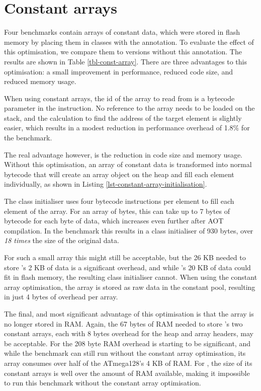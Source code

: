 \section{Constant arrays}
\label{sec-evaluation-const-array}


Four benchmarks contain arrays of constant data, which were stored in flash memory by placing them in classes with the  annotation. To evaluate the effect of this optimisation, we compare them to versions without this annotation. The results are shown in Table \ref{tbl-const-array}. There are three advantages to this optimisation: a small improvement in performance, reduced code size, and reduced memory usage.

When using constant arrays, the id of the array to read from is a bytecode parameter in the  instruction. No reference to the array needs to be loaded on the stack, and the calculation to find the address of the target element is slightly easier, which results in a modest reduction in performance overhead of 1.8\% for the  benchmark.

The real advantage however, is the reduction in code size and memory usage. Without this optimisation, an array of constant data is transformed into normal bytecode that will create an array object on the heap and fill each element individually, as shown in Listing \ref{lst-constant-array-initialisation}.

The class initialiser uses four bytecode instructions per element to fill each element of the array. For an array of bytes, this can take up to 7 bytes of bytecode for each byte of data, which increases even further after AOT compilation. In the  benchmark this results in a class initialiser of 930 bytes, over \emph{18 times} the size of the original data. 

For such a small array this might still be acceptable, but the 26 KB needed to store 's 2 KB of data is a significant overhead, and while 's 20 KB of data could fit in flash memory, the resulting class initialiser cannot. When using the constant array optimisation, the array is stored as raw data in the constant pool, resulting in just 4 bytes of overhead per array.

The final, and most significant advantage of this optimisation is that the array is no longer stored in RAM. Again, the 67 bytes of RAM needed to store 's two constant arrays, each with 8 bytes overhead for the heap and array headers, may be acceptable. For  the 208 byte RAM overhead is starting to be significant, and while the  benchmark can still run without the constant array optimisation, its array consumes over half of the ATmega128's 4 KB of RAM. For , the size of its constant arrays is well over the amount of RAM available, making it impossible to run this benchmark without the constant array optimisation.